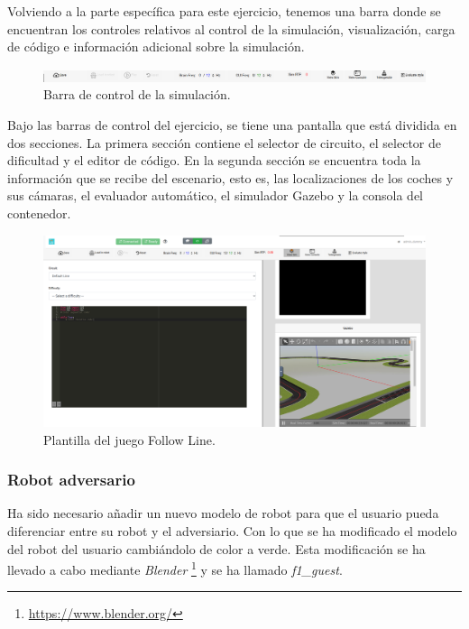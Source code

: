 \documentclass[a4paper, 12pt]{book}
\begin{document}
Volviendo a la parte específica para este ejercicio, tenemos una barra donde se encuentran los controles relativos al control de la simulación, visualización, carga de código e información adicional sobre la simulación.

\begin{figure}[H]
	\centering
    \includegraphics[width=15cm]{img/barra_control.png}
    \caption{Barra de control de la simulación.}
    \label{figura:conexion_radi}
\end{figure}

Bajo las barras de control del ejercicio, se tiene una pantalla que está dividida en dos secciones. La primera sección contiene el selector de circuito, el selector de dificultad y el editor de código. En la segunda sección se encuentra toda la información que se recibe del escenario, esto es, las localizaciones de los coches y sus cámaras, el evaluador automático, el simulador Gazebo y la consola del contenedor.


\begin{figure}[H]
	\centering
    \includegraphics[width=15cm]{img/follow_line_game.png}
    \caption{Plantilla del juego Follow Line.}
    \label{figura:conexion_radi}
\end{figure}

\subsubsection{Robot adversario}
\label{follow_line_game_adversario}


Ha sido necesario añadir un nuevo modelo de robot para que el usuario pueda diferenciar entre su robot y el adversiario. Con lo que se ha modificado el modelo del robot del usuario cambiándolo de color a verde. Esta modificación se ha llevado a cabo mediante \emph{Blender} \footnote{\url{https://www.blender.org/}} y se ha llamado \emph{f1\_guest}.
\end{document}
